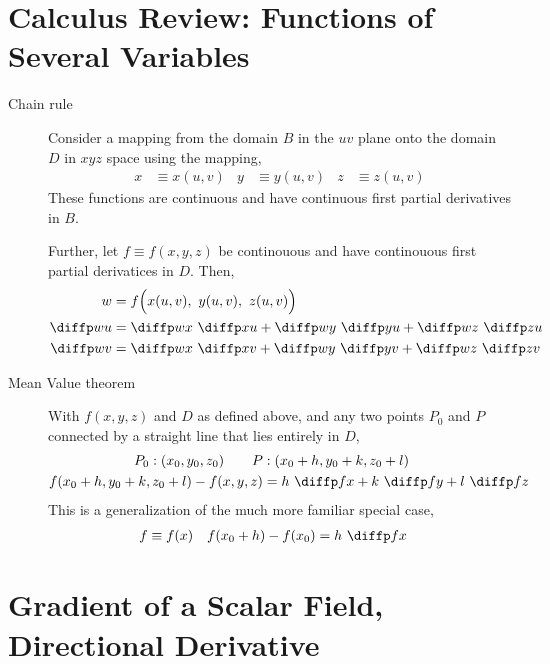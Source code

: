 \section{Calculus Review: Functions of Several Variables}

\begin{description}
    \item[Chain rule] Consider a mapping from the domain $ B $ in the $ uv $ plane
          onto the domain $ D $ in $ xyz $ space using the mapping,
          \begin{align}
              x & \equiv x(u, v) & y & \equiv y(u, v) & z & \equiv z(u, v)
          \end{align}
          These functions are continuous and have continuous first partial derivatives in
          $ B $. \par
          Further, let $ f \equiv f(x, y, z) $ be continouous and have continouous first
          partial derivatices in $ D $. Then,
          \begin{align}
              w         & = f\Big( x(u, v),\ y(u, v),\ z(u, v) \Big)    \\
              \diffp wu & = \diffp wx\ \diffp xu + \diffp wy\ \diffp yu
              + \diffp wz\ \diffp zu                                    \\
              \diffp wv & = \diffp wx\ \diffp xv + \diffp wy\ \diffp yv
              + \diffp wz\ \diffp zv
          \end{align}

    \item[Mean Value theorem] With $ f(x, y, z) $ and $ D $ as defined above, and any
          two points $ P_0 $ and $ P $ connected by a straight line that lies entirely in
          $ D $,
          \begin{align}
              P_0 : (x_0, y_0, z_0)  \qquad
              P                                         & : (x_0 + h, y_0 + k, z_0 + l) \\
              f(x_0 + h, y_0 + k, z_0 + l) - f(x, y, z) & = h\ \diffp fx + k\ \diffp fy
              + l\ \diffp fz
          \end{align}
          This is a generalization of the much more familiar special case,
          \begin{align}
              f & \equiv f(x) & f(x_0 + h) - f(x_0) & = h\ \diffp fx
          \end{align}
\end{description}

\section{Gradient of a Scalar Field, Directional Derivative}

